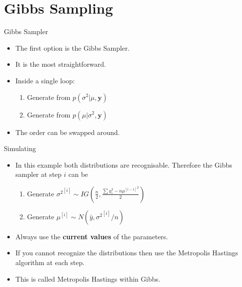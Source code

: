 \documentclass[10pt]{beamer}
\begin{document}
\section{Gibbs Sampling}
\begin{frame}{Gibbs Sampler}
  \begin{itemize}
  \item The first option is the Gibbs Sampler.

  \item It is the most straightforward.

  \item Inside a single loop:

    \begin{enumerate}
    \item Generate from $p(\sigma^2|\mu,{\bm y})$
    \item Generate from $p(\mu|\sigma^2,{\bm y})$

    \end{enumerate}

  \item The order can be swapped around.
  \end{itemize}
\end{frame}
\begin{frame}{Simulating}
  \begin{itemize}
  \item In this example both distributions are recognisable.  Therefore the Gibbs sampler at step $i$ can be

    \begin{enumerate}
    \item Generate ${\sigma^2}^{[i]}\sim IG(\frac{n}{2},\frac{\sum y_i^2-n{\mu^{[i-1]}}^2}{2})$
    \item Generate $\mu^{[i]}\sim N(\bar{y},{\sigma^2}^{[i]}/n)$

    \end{enumerate}

  \item Always  use the {\bf current values} of the parameters.

  \item If you cannot recognize the distributions then use the Metropolis Hastings algorithm at each step.

  \item This is called Metropolis Hastings within Gibbs.
  \end{itemize}
\end{frame}
\end{document}
